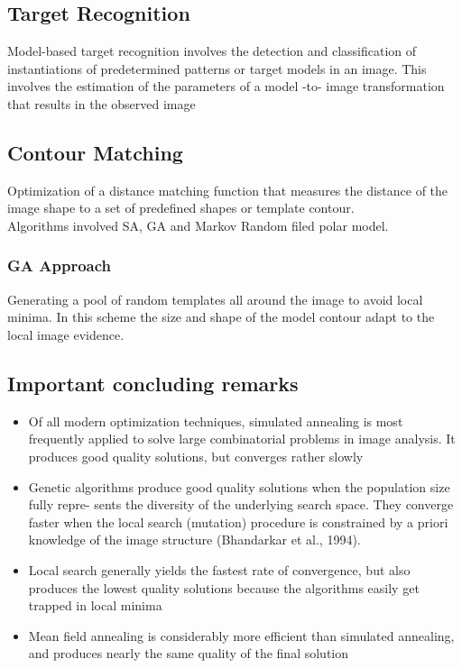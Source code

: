 \documentclass{article}
\begin{document}
\subsection*{Target Recognition}
Model-based target recognition involves the detection and classification of instantiations
of predetermined patterns or target models in an image. This involves the estimation of the
parameters of a model -to- image transformation that results in the observed image

\subsection*{Contour Matching}
Optimization of a \textrm{distance matching} function that measures the distance of the
image shape to a set of predefined shapes or template contour.\\

Algorithms involved SA, GA and Markov Random filed polar model.

\subsubsection*{GA Approach}
Generating a pool of random templates all around the image to avoid local minima.
In this scheme the size and shape of the model contour adapt to the local image evidence.


\subsection{Important concluding remarks}
\begin{itemize}
\item Of all modern optimization techniques, simulated annealing is most frequently applied to
solve large combinatorial problems in image analysis. It produces good quality solutions,
but converges rather slowly

\item Genetic algorithms produce good quality solutions when the population size fully repre-
sents the diversity of the underlying search space. They converge faster when the local
search (mutation) procedure is constrained by a priori knowledge of the image structure
(Bhandarkar et al., 1994).

\item Local search generally yields the fastest rate of convergence, but also produces the lowest
quality solutions because the algorithms easily get trapped in local minima

\item Mean field annealing is considerably more efficient than simulated annealing, and produces
nearly the same quality of the final solution 

\end{itemize}
\end{document}
